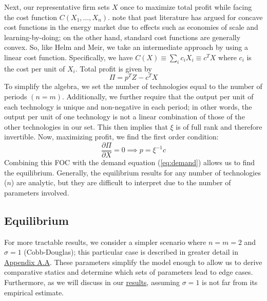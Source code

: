\documentclass[11pt,a4paper,leqno]{extarticle}
\begin{document}
	Next, our representative firm sets $X$ once to maximize total profit while facing the cost function $C(X_1, \dots, X_n)$.  \citet{HH} note that past literature has argued for concave cost functions in the energy market due to effects such as economies of scale and learning-by-doing; on the other hand, standard cost functions are generally convex. So, like Helm and Meir, we take an intermediate approach by using a linear cost function. Specifically, we have $C(X) \equiv \sum_i c_i X_i \equiv c^T X$ where $c_i$ is the cost per unit of $X_i$. Total profit is given by 
	\begin{equation}
	\Pi = p^T Z - c^T X
	\end{equation}
	To simplify the algebra, we set the number of technologies equal to the number of periods $(n=m)$. Additionally, we further require that the output per unit of each technology is unique and non-negative in each period; in other words, the output per unit of one technology is not a linear combination of those of the other technologies in our set. This then implies that $\xi$ is of full rank and therefore invertible.  Now, maximizing profit, we find the first order condition:
	\begin{equation}
	\frac{\partial \Pi}{\partial X} = 0 \implies p = \xi^{-1} c
	\end{equation}
	Combining this FOC with the demand equation (\cref{eq:demand}) allows us to find the equilibrium. Generally, the equilibrium results for any number of technologies ($n$) are analytic, but they are difficult to interpret due to the number of parameters involved. 
	
	\subsection{Equilibrium}
	
	For more tractable results, we consider a simpler scenario where $n = m = 2$ and $\sigma = 1$ (Cobb-Douglas); this particular case is described in greater  detail  in \hyperref[sec:cobbdoug]{Appendix A.A}. These parameters simplify the model enough to allow us to derive comparative statics and determine which sets of parameters lead to edge cases. Furthermore, as we will discuss in our \hyperref[sec:results]{results}, assuming $\sigma=1$ is not far from its empirical estimate. 
	
\end{document}

